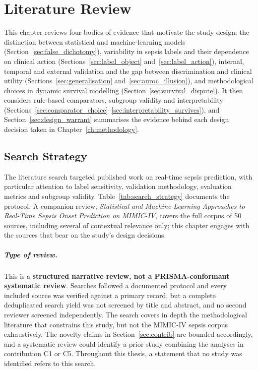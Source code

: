 \chapter{Literature Review}
\label{ch:review}

This chapter reviews four bodies of evidence that motivate the study design:
the distinction between statistical and machine-learning models
(Section~\ref{sec:false_dichotomy}), variability in sepsis labels and their
dependence on clinical action (Sections~\ref{sec:label_object}
and~\ref{sec:label_action}), internal, temporal and external validation and the
gap between discrimination and clinical utility
(Sections~\ref{sec:generalisation} and~\ref{sec:auroc_illusion}), and
methodological choices in dynamic survival modelling
(Section~\ref{sec:survival_dispute}). It then considers rule-based comparators,
subgroup validity and interpretability
(Sections~\ref{sec:comparator_choice}--\ref{sec:interpretability_survives}),
and Section~\ref{sec:design_warrant} summarises the evidence behind each design
decision taken in Chapter~\ref{ch:methodology}.


\section{Search Strategy}
\label{sec:search_strategy}

The literature search targeted published work on real-time sepsis prediction,
with particular attention to label sensitivity, validation methodology,
evaluation metrics and subgroup validity. Table~\ref{tab:search_strategy}
documents the protocol. A companion review, \textit{Statistical and
Machine-Learning Approaches to Real-Time Sepsis Onset Prediction on MIMIC-IV},
covers the full corpus of 50 sources, including several of contextual
relevance only; this chapter engages with the sources that bear on the study's
design decisions.

\paragraph{Type of review.} This is a \textbf{structured narrative review, not
a PRISMA-conformant systematic review}. Searches followed a documented protocol
and every included source was verified against a primary record, but a
complete deduplicated search yield was not screened by title and abstract, and
no second reviewer screened independently. The search covers in depth the
methodological literature that constrains this study, but not the MIMIC-IV
sepsis corpus exhaustively. The novelty claims in Section~\ref{sec:contrib} are
bounded accordingly, and a systematic review could identify a prior study
combining the analyses in contribution C1 or C5. Throughout this thesis, a
statement that no study was identified refers to this search.

